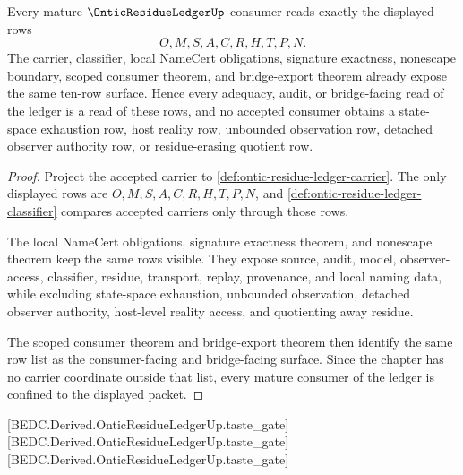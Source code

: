 \begin{theorem}
\label{thm:ontic-residue-ledger-mature-consumer-surface}
Every mature $\OnticResidueLedgerUp$ consumer reads exactly the displayed rows
$$
O,M,S,A,C,R,H,T,P,N.
$$
The carrier, classifier, local NameCert obligations, signature exactness,
nonescape boundary, scoped consumer theorem, and bridge-export theorem already
expose the same ten-row surface. Hence every adequacy, audit, or bridge-facing
read of the ledger is a read of these rows, and no accepted consumer obtains a
state-space exhaustion row, host reality row, unbounded observation row,
detached observer authority row, or residue-erasing quotient row.
\end{theorem}
\begin{proof}
Project the accepted carrier to \autoref{def:ontic-residue-ledger-carrier}.
The only displayed rows are $O,M,S,A,C,R,H,T,P,N$, and
\autoref{def:ontic-residue-ledger-classifier} compares accepted carriers only
through those rows.

The local NameCert obligations, signature exactness theorem, and nonescape
theorem keep the same rows visible. They expose source, audit, model,
observer-access, classifier, residue, transport, replay, provenance, and local
naming data, while excluding state-space exhaustion, unbounded observation,
detached observer authority, host-level reality access, and quotienting away
residue.

The scoped consumer theorem and bridge-export theorem then identify the same
row list as the consumer-facing and bridge-facing surface. Since the chapter
has no carrier coordinate outside that list, every mature consumer of the
ledger is confined to the displayed packet.
\end{proof}

[BEDC.Derived.OnticResidueLedgerUp.taste\_gate]
[BEDC.Derived.OnticResidueLedgerUp.taste\_gate]
[BEDC.Derived.OnticResidueLedgerUp.taste\_gate]

